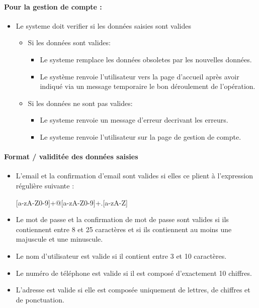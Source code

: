\documentclass{article}
\begin{document}
\paragraph{Pour la gestion de compte : }
\begin{itemize}
\item Le systeme doit verifier si les données saisies sont valides
	\begin{itemize}
	\item Si les données sont valides:
		\begin{itemize}
		\item Le systeme remplace les données obsoletes par
                  les nouvelles données.
                \item Le système renvoie l'utilisateur vers la page d'accueil
                 après avoir indiqué via un message temporaire le bon déroulement de l'opération.
		\end{itemize}
		\item Si les données ne sont pas valides:
		\begin{itemize}
		\item Le systeme renvoie un message d'erreur decrivant
                  les erreurs.
                \item Le systeme renvoie l'utilisateur sur la page de
                  gestion de compte.
		\end{itemize}
	\end{itemize}
\end{itemize}

\paragraph{Format / validitée des données saisies}
\begin{itemize}
\item L'email  et la confirmation d'email sont valides si elles ce plient à l'expression régulière
  suivante :

[a-zA-Z0-9]+@[a-zA-Z0-9]+.[a-zA-Z]

\item Le mot de passe et la confirmation de mot de passe sont valides si ils contiennent entre 8 et 25
  caractères et si ils contiennent au moins une majuscule et une minuscule.

\item Le nom d'utilisateur est valide si il contient entre 3 et 10
  caractères.

\item Le numéro de téléphone est valide si il est composé d'exactement
  10 chiffres.

\item L'adresse est valide si elle est composée uniquement de lettres,
  de chiffres et de ponctuation.
\end{itemize}
\end{document}
